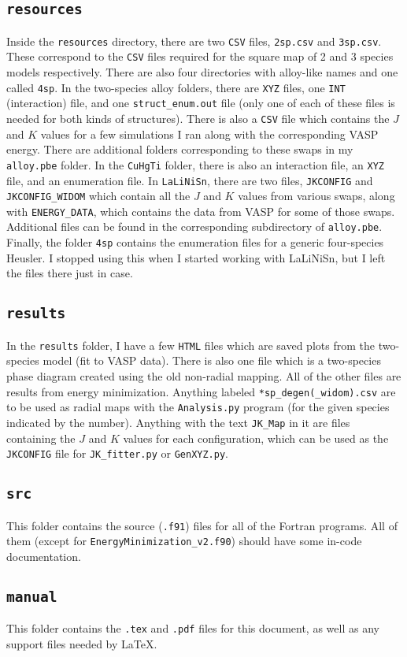 \documentclass[12pt]{article}
\begin{document}
\subsection{\texttt{resources}}
Inside the \texttt{resources} directory, there are two \texttt{CSV} files, \texttt{2sp.csv} and \texttt{3sp.csv}. These correspond to the \texttt{CSV} files required for the square map of 2 and 3 species models respectively. There are also four directories with alloy-like names and one called \texttt{4sp}. In the two-species alloy folders, there are \texttt{XYZ} files, one \texttt{INT} (interaction) file, and one \texttt{struct\_enum.out} file (only one of each of these files is needed for both kinds of structures). There is also a \texttt{CSV} file which contains the $J$ and $K$ values for a few simulations I ran along with the corresponding VASP energy. There are additional folders corresponding to these swaps in my \texttt{alloy.pbe} folder. In the \texttt{CuHgTi} folder, there is also an interaction file, an \texttt{XYZ} file, and an enumeration file. In \texttt{LaLiNiSn}, there are two files, \texttt{JKCONFIG} and \texttt{JKCONFIG\_WIDOM} which contain all the $J$ and $K$ values from various swaps, along with \texttt{ENERGY\_DATA}, which contains the data from VASP for some of those swaps. Additional files can be found in the corresponding subdirectory of \texttt{alloy.pbe}. Finally, the folder \texttt{4sp} contains the enumeration files for a generic four-species Heusler. I stopped using this when I started working with LaLiNiSn, but I left the files there just in case.

\subsection{\texttt{results}}
In the \texttt{results} folder, I have a few \texttt{HTML} files which are saved plots from the two-species model (fit to VASP data). There is also one file which is a two-species phase diagram created using the old non-radial mapping. All of the other files are results from energy minimization. Anything labeled \texttt{*sp\_degen(\_widom).csv} are to be used as radial maps with the \texttt{Analysis.py} program (for the given species indicated by the number). Anything with the text \texttt{JK\_Map} in it are files containing the $J$ and $K$ values for each configuration, which can be used as the \texttt{JKCONFIG} file for \texttt{JK\_fitter.py} or \texttt{GenXYZ.py}.

\subsection{\texttt{src}}

This folder contains the source (\texttt{.f91}) files for all of the Fortran programs. All of them (except for \texttt{EnergyMinimization\_v2.f90}) should have some in-code documentation.

\subsection{\texttt{manual}}

This folder contains the \texttt{.tex} and \texttt{.pdf} files for this document, as well as any support files needed by \LaTeX.
\end{document}
